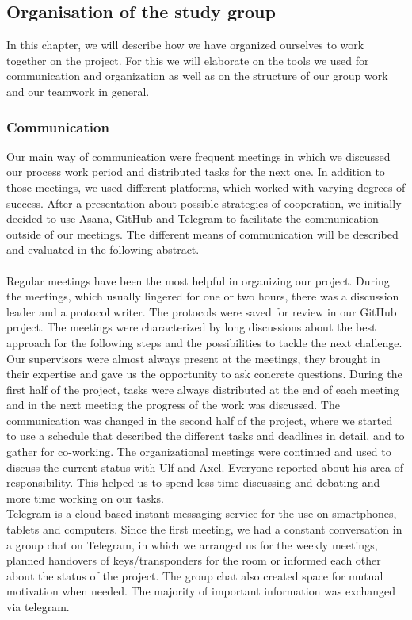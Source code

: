 \subsection{Organisation of the study group}

In this chapter, we will describe how we have organized ourselves to work together on the project. For this we will elaborate on the tools we used for communication and organization as well as on the structure of our group work and our teamwork in general.


\subsubsection{Communication}

Our main way of communication were frequent meetings in which we discussed our process work period and distributed tasks for the next one. In addition to those meetings, we used different platforms, which worked with varying degrees of success. After a presentation about possible strategies of cooperation, we initially decided to use Asana, GitHub and Telegram to facilitate the communication outside of our meetings. The different means of communication will be described and evaluated in the following abstract. \\
\\
Regular meetings have been the most helpful in organizing our project. During the meetings, which usually lingered for one or two hours, there was a discussion leader and a protocol writer. The protocols were saved for review in our GitHub project. The meetings were characterized by long discussions about the best approach for the following steps and the possibilities to tackle the next challenge. Our supervisors were almost always present at the meetings, they brought in their expertise and gave us the opportunity to ask concrete questions. During the first half of the project, tasks were always distributed at the end of each meeting and in the next meeting the progress of the work was discussed. The communication was changed in the second half of the project,  where we started to use a schedule that described the different tasks and deadlines in detail, and to gather for co-working. The organizational meetings were continued and used to discuss the current status with Ulf and Axel. Everyone reported about his area of responsibility. This helped us to spend less time discussing and debating and more time working on our tasks. \\
Telegram is a cloud-based instant messaging service for the use on smartphones, tablets and computers. Since the first meeting, we had a constant conversation in a group chat on Telegram, in which we arranged us for the weekly meetings, planned handovers of keys/transponders for the room or informed each other about the status of the project. The group chat also created space for mutual motivation when needed. The majority of important information was exchanged via telegram. \\
